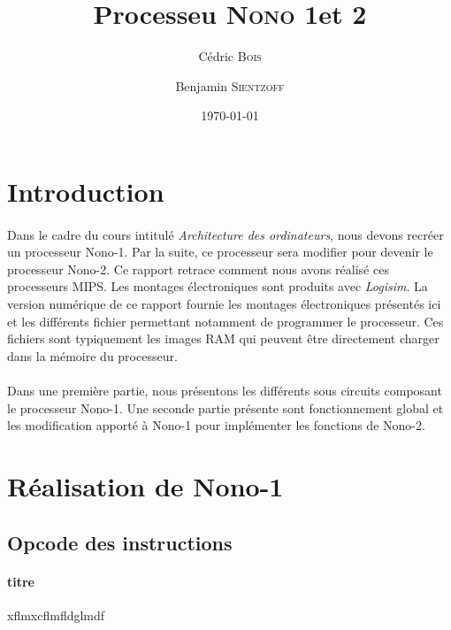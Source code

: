 \documentclass[a4paper]{article}
\title{Processeu \textsc{Nono} 1et 2}
\author{Cédric \textsc{Bois} \and Benjamin \textsc{Sientzoff}}
\date{\today}
\begin{document}
	\maketitle
	\newpage
	\tableofcontents
	\newpage %
	
	\section*{Introduction}

	\paragraph{}{
	Dans le cadre du cours intitulé \textit{Architecture des ordinateurs}, nous devons recréer
	un processeur Nono-1. Par la suite, ce processeur sera modifier pour devenir le processeur
	Nono-2. Ce rapport retrace comment nous avons réalisé ces processeurs MIPS. \newline
	Les montages électroniques sont produits avec \textit{Logisim}. La version numérique de
	ce rapport fournie les montages électroniques présentés ici et les différents fichier 
	permettant notamment de programmer le processeur. Ces fichiers sont typiquement les images
	RAM qui peuvent être directement charger dans la mémoire du processeur.
	}
	
	\paragraph{}{
	Dans une première partie, nous présentons les différents sous circuits composant le processeur Nono-1.
	Une seconde partie présente sont fonctionnement global et les modification apporté à Nono-1 pour
	implémenter les fonctions de Nono-2.
	}
	
	\newpage
	\section{Réalisation de Nono-1}
	
		\subsection{Opcode des instructions}
			
			\paragraph{titre }{xflmxcflmfldglmdf}
			
\end{document}
